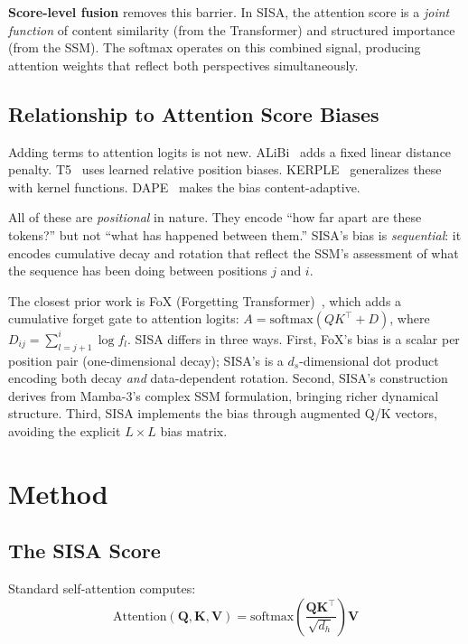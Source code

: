 \documentclass[11pt]{article}
\begin{document}
\textbf{Score-level fusion} removes this barrier. In SISA, the attention score is a \emph{joint function} of content similarity (from the Transformer) and structured importance (from the SSM). The softmax operates on this combined signal, producing attention weights that reflect both perspectives simultaneously.

\subsection{Relationship to Attention Score Biases}

Adding terms to attention logits is not new. ALiBi~\citep{alibi} adds a fixed linear distance penalty. T5~\citep{raffel2020t5} uses learned relative position biases. KERPLE~\citep{kerple} generalizes these with kernel functions. DAPE~\citep{dape} makes the bias content-adaptive.

All of these are \emph{positional} in nature. They encode ``how far apart are these tokens?'' but not ``what has happened between them.'' SISA's bias is \emph{sequential}: it encodes cumulative decay and rotation that reflect the SSM's assessment of what the sequence has been doing between positions $j$ and $i$.

The closest prior work is FoX (Forgetting Transformer)~\citep{fox}, which adds a cumulative forget gate to attention logits: $A = \text{softmax}(QK^\top + D)$, where $D_{ij} = \sum_{l=j+1}^{i} \log f_l$. SISA differs in three ways. First, FoX's bias is a scalar per position pair (one-dimensional decay); SISA's is a $d_s$-dimensional dot product encoding both decay \emph{and} data-dependent rotation. Second, SISA's construction derives from Mamba-3's complex SSM formulation, bringing richer dynamical structure. Third, SISA implements the bias through augmented Q/K vectors, avoiding the explicit $L \times L$ bias matrix.

\section{Method}

\subsection{The SISA Score}

Standard self-attention computes:
\begin{equation}
\text{Attention}(\mathbf{Q}, \mathbf{K}, \mathbf{V}) = \text{softmax}\!\left(\frac{\mathbf{Q}\mathbf{K}^\top}{\sqrt{d_h}}\right) \mathbf{V}
\end{equation}
\end{document}
